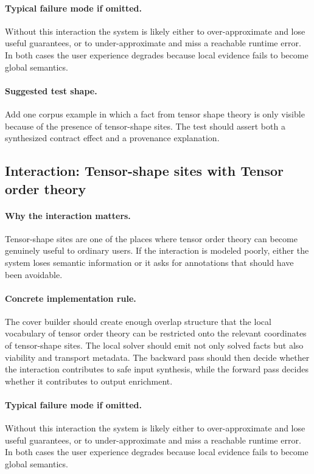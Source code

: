\documentclass[11pt]{report}
\theoremstyle{definition}
\theoremstyle{plain}
\begin{document}
\paragraph{Typical failure mode if omitted.}
Without this interaction the system is likely either to over-approximate and
lose useful guarantees, or to under-approximate and miss a reachable runtime
error. In both cases the user experience degrades because local evidence
fails to become global semantics.

\paragraph{Suggested test shape.}
Add one corpus example in which a fact from tensor shape theory is only
visible because of the presence of tensor-shape sites. The test should
assert both a synthesized contract effect and a provenance explanation.

\subsection{Interaction: Tensor-shape sites with Tensor order theory}

\paragraph{Why the interaction matters.}
Tensor-shape sites are one of the places where tensor order theory can become
genuinely useful to ordinary users. If the interaction is modeled poorly,
either the system loses semantic information or it asks for annotations that
should have been avoidable.

\paragraph{Concrete implementation rule.}
The cover builder should create enough overlap structure that the local
vocabulary of tensor order theory can be restricted onto the relevant
coordinates of tensor-shape sites. The local solver should emit not only
solved facts but also viability and transport metadata. The backward pass
should then decide whether the interaction contributes to safe input
synthesis, while the forward pass decides whether it contributes to output
enrichment.

\paragraph{Typical failure mode if omitted.}
Without this interaction the system is likely either to over-approximate and
lose useful guarantees, or to under-approximate and miss a reachable runtime
error. In both cases the user experience degrades because local evidence
fails to become global semantics.
\end{document}
